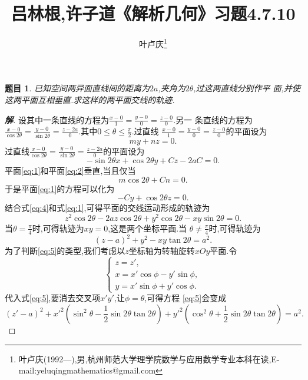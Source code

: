 \documentclass[a4paper]{article}
\newtheorem*{exe}{题目}
\newenvironment{exercise}
{\bigskip\begin{mdframed}\begin{exe}}
    {\end{exe}\end{mdframed}\bigskip}
\begin{document}
\title{\huge{\bf{吕林根,许子道《解析几何》习题4.7.10}}} \author{\small{叶卢庆\footnote{叶卢庆(1992---),男,杭州师范大学理学院数学与应用数学专业本科在读,E-mail:yeluqingmathematics@gmail.com}}}
\maketitle
\begin{exercise}
  已知空间两异面直线间的距离为$2a$,夹角为$2\theta$,过这两直线分别作平
  面,并使这两平面互相垂直.求这样的两平面交线的轨迹.
\end{exercise}
\begin{proof}[\textbf{解}]
设其中一条直线的方程为$\frac{x-0}{1}=\frac{y-0}{0}=\frac{z-0}{0}$.另一
条直线的方程为$\frac{x-0}{\cos2\theta}=\frac{y-0}{\sin
  2\theta}=\frac{z-2a}{0}$.其中$0\leq\theta\leq \frac{\pi}{2}$.过直线
$\frac{x-0}{1}=\frac{y-0}{0}=\frac{z-0}{0}$的平面设为
\begin{equation}
  \label{eq:1}
  my+nz=0.
\end{equation}
过直线$\frac{x-0}{\cos2\theta}=\frac{y-0}{\sin
  2\theta}=\frac{z-2a}{0}$的平面设为
\begin{equation}
  \label{eq:2}
  -\sin 2\theta x+\cos 2\theta y+Cz-2aC=0.
\end{equation}
平面\eqref{eq:1}和平面\eqref{eq:2}垂直,当且仅当
\begin{equation}
  \label{eq:3}
  m\cos2\theta+Cn=0.
\end{equation}
于是平面\eqref{eq:1}的方程可以化为
\begin{equation}
  \label{eq:4}
  -Cy+\cos2\theta z=0.
\end{equation}
结合式\eqref{eq:4}和式\eqref{eq:1},可得平面的交线运动形成的轨迹为
$$
z^2\cos2\theta-2az\cos2\theta+y^2\cos2\theta-xy\sin 2\theta=0.
$$
当$\theta=\frac{\pi}{4}$时,可得轨迹为$xy=0$,这是两个坐标平面.当
$\theta\neq \frac{\pi}{4}$时,可得轨迹为
\begin{equation}\label{eq:5}
(z-a)^2+y^2-xy\tan2\theta=a^2.
\end{equation}
为了判断\eqref{eq:5}的类型,我们考虑以$z$坐标轴为转轴旋转$xOy$平面.令
$$
\begin{cases}
  z=z',\\
x=x'\cos\phi-y'\sin\phi,\\
y=x'\sin\phi+y'\cos\phi.
\end{cases}
$$
代入式\eqref{eq:5},要消去交叉项$x'y'$,让$\phi=\theta$,可得方程
\eqref{eq:5}会变成
$$
(z'-a)^2+x'^2(\sin^2\theta-\frac{1}{2}\sin2\theta\tan2\theta)+y'^2(\cos^2\theta+\frac{1}{2}\sin
2\theta\tan2\theta)=a^2.
$$
\end{proof}
\end{document}
